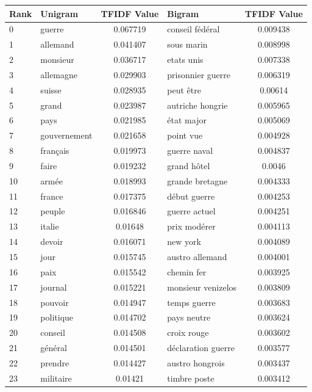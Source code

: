 \documentclass[11pt]{article}
\begin{document}
\begin{table}[H]
\centering
\small
{}\label{propaganda_table_fr}
\begin{tabular*}{\textwidth}{|l|| @{\extracolsep{\fill}} l c || l c |} 
\hline
Rank & Unigram & TFIDF Value  & Bigram & TFIDF Value \\
\hline
\hline
0 & guerre & 0.067719 & conseil fédéral & 0.009438 \\
1 & allemand & 0.041407 & sous marin & 0.008998 \\
2 & monsieur & 0.036717 & etats unis & 0.007338 \\
3 & allemagne & 0.029903 & prisonnier guerre & 0.006319 \\
4 & suisse & 0.028935 & peut être & 0.00614 \\
5 & grand & 0.023987 & autriche hongrie & 0.005965 \\
6 & pays & 0.021985 & état major & 0.005069 \\
7 & gouvernement & 0.021658 & point vue & 0.004928 \\
8 & français & 0.019973 & guerre naval & 0.004837 \\
9 & faire & 0.019232 & grand hôtel & 0.0046 \\
10 & armée & 0.018993 & grande bretagne & 0.004333 \\
11 & france & 0.017375 & début guerre & 0.004253 \\
12 & peuple & 0.016846 & guerre actuel & 0.004251 \\
13 & italie & 0.01648 & prix modérer & 0.004113 \\
14 & devoir & 0.016071 & new york & 0.004089 \\
15 & jour & 0.015745 & austro allemand & 0.004001 \\
16 & paix & 0.015542 & chemin fer & 0.003925 \\
17 & journal & 0.015221 & monsieur venizelos & 0.003809 \\
18 & pouvoir & 0.014947 & temps guerre & 0.003683 \\
19 & politique & 0.014702 & pays neutre & 0.003624 \\
20 & conseil & 0.014508 & croix rouge & 0.003602 \\
21 & général & 0.014501 & déclaration guerre & 0.003577 \\
22 & prendre & 0.014427 & austro hongrois & 0.003437 \\
23 & militaire & 0.01421 & timbre poste & 0.003412 \\

\end{tabular*}
\end{table}
\end{document}
